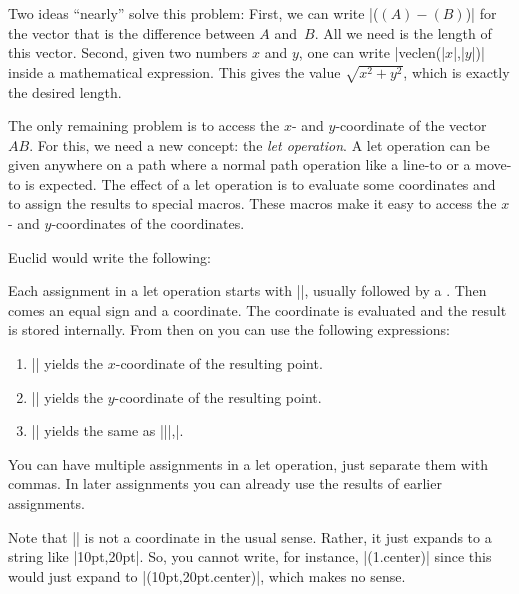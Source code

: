Two ideas ``nearly'' solve this problem: First, we can write |($ (A) - (B) $)|
for the vector that is the difference between $A$ and~$B$. All we need is the
length of this vector. Second, given two numbers $x$ and $y$, one can write
|veclen(|$x$|,|$y$|)| inside a mathematical expression. This gives the value
$\sqrt{x^2+y^2}$, which is exactly the desired length.

The only remaining problem is to access the $x$- and $y$-coordinate of the
vector~$AB$. For this, we need a new concept: the \emph{let operation}. A let
operation can be given anywhere on a path where a normal path operation like a
line-to or a move-to is expected. The effect of a let operation is to evaluate
some coordinates and to assign the results to special macros. These macros make
it easy to access the $x$- and $y$-coordinates of the coordinates.

Euclid would write the following:
%
\begin{codeexample}[preamble={\usetikzlibrary{calc}}]
\end{codeexample}

Each assignment in a let operation starts with |\p|, usually followed by a
. Then comes an equal sign and a coordinate. The coordinate is
evaluated and the result is stored internally. From then on you can use the
following expressions:
%
\begin{enumerate}
    \item |\x| yields the $x$-coordinate of the resulting point.
    \item |\y| yields the $y$-coordinate of the resulting point.
    \item |\p| yields the same as
        |\x||,\y|.
\end{enumerate}
%
You can have multiple assignments in a let operation, just separate them with
commas. In later assignments you can already use the results of earlier
assignments.

Note that || is not a coordinate in the usual sense. Rather, it just expands
to a string like |10pt,20pt|. So, you cannot write, for instance,
|(\p1.center)| since this would just expand to |(10pt,20pt.center)|, which
makes no sense.

